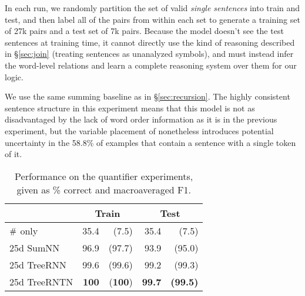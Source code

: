 

In each run, we randomly partition the set of valid \textit{single sentences} into train and test, and then label all of the pairs from within each set to generate a training set of 27k pairs and a test set of 7k pairs. Because the model doesn't see the test sentences at training time, it cannot directly use the kind of reasoning described in \S\ref{sec:join} (treating sentences as unanalyzed symbols), and must instead infer the word-level relations and learn a complete reasoning system over them for our logic. 

We use the same summing baseline as in \S\ref{sec:recursion}.
The highly consistent  sentence structure in this experiment means that this model
is not as disadvantaged by the lack of word order information as it is in the previous experiment, 
but the variable placement of   nonetheless introduces potential uncertainty in the 58.8\% 
of examples that contain a sentence with a single token of it.

\begin{table}[tp]
  \centering\small
    \begin{tabular}{ l r@{ \ }r r@{ \ }r }
    
    \toprule
    ~ & \multicolumn{2}{c}{Train} & \multicolumn{2}{c}{Test} \\
    \midrule
    $\mathbin{\#}$ only &	35.4 & (7.5)	& 35.4	& (7.5)\\
    25d SumNN	&	96.9&	(97.7)&	93.9&	(95.0)\\	
    25d TreeRNN	&	99.6&	(99.6)&	99.2&	(99.3)\\
    25d TreeRNTN	&	\textbf{100}&(\textbf{100})&	\textbf{99.7} & \textbf{(99.5)}\\
    \bottomrule
  \end{tabular}
  
  \caption{Performance on the quantifier experiments, given as \% correct and macroaveraged F1.}
  \label{qresultstable}
\end{table} 

